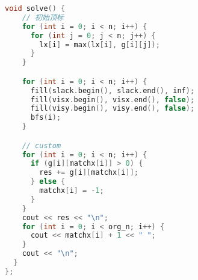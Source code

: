 \begin{lstlisting}[language=c++]
  void solve() {
    // 初始顶标
    for (int i = 0; i < n; i++) {
      for (int j = 0; j < n; j++) {
        lx[i] = max(lx[i], g[i][j]);
      }
    }

    for (int i = 0; i < n; i++) {
      fill(slack.begin(), slack.end(), inf);
      fill(visx.begin(), visx.end(), false);
      fill(visy.begin(), visy.end(), false);
      bfs(i);
    }

    // custom
    for (int i = 0; i < n; i++) {
      if (g[i][matchx[i]] > 0) {
        res += g[i][matchx[i]];
      } else {
        matchx[i] = -1;
      }
    }
    cout << res << "\n";
    for (int i = 0; i < org_n; i++) {
      cout << matchx[i] + 1 << " ";
    }
    cout << "\n";
  }
};

\end{lstlisting}